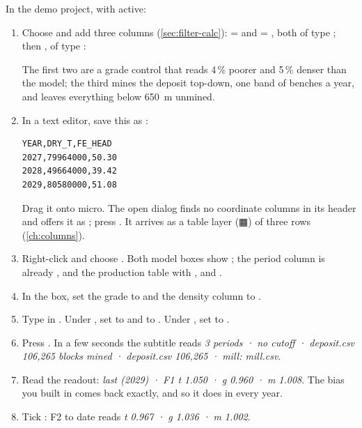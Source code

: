 \begin{tryit}
In the demo project, with  active:
\begin{enumerate}
\item Choose  and add three columns (\cref{sec:filter-calc}):  =  and  = , both of type ; then , of type :


The first two are a grade control that reads 4\,\% poorer and 5\,\% denser than the model; the third mines the deposit top-down, one band of benches a year, and leaves everything below 650~m unmined.
\item In a text editor, save this as :
\begin{lstlisting}
YEAR,DRY_T,FE_HEAD
2027,79964000,50.30
2028,49664000,39.42
2029,80580000,51.08
\end{lstlisting}
Drag it onto micro. The open dialog finds no coordinate columns in its header and offers it as ; press . It arrives as a table layer (▦) of three rows (\cref{ch:columns}).
\item Right-click  and choose . Both model boxes show ; the period column is already , and the production table  with ,  and .
\item In the  box, set the grade to  and the density column to .
\item Type  in . Under , set  to \ui{\%} and  to . Under , set  to .
\item Press . In a few seconds the subtitle reads \emph{3 periods · no cutoff · deposit.csv 106,265 blocks mined · deposit.csv 106,265 · mill: mill.csv}.
\item Read the readout: \emph{last (2029) · F1 t 1.050 · g 0.960 · m 1.008}. The bias you built in comes back exactly, and so it does in every year.
\item Tick : F2 to date reads \emph{t 0.967 · g 1.036 · m 1.002}.
\end{enumerate}
\end{tryit}

